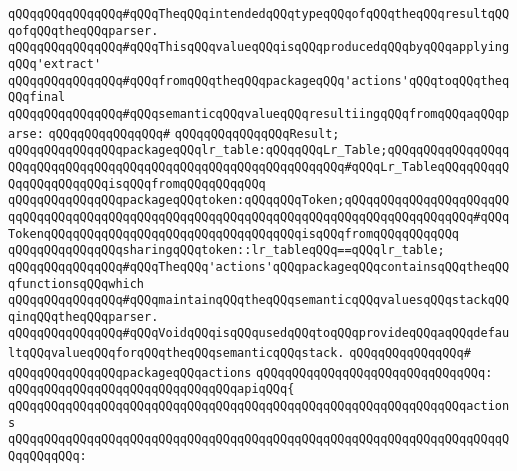 \newline
\verb|qQQqqQQqqQQqqQQq#qQQqTheqQQqintendedqQQqtypeqQQqofqQQqtheqQQqresultqQQqofqQQqtheqQQqparser.|\newline
\verb|qQQqqQQqqQQqqQQq#qQQqThisqQQqvalueqQQqisqQQqproducedqQQqbyqQQqapplyingqQQq'extract'|\newline
\verb|qQQqqQQqqQQqqQQq#qQQqfromqQQqtheqQQqpackageqQQq'actions'qQQqtoqQQqtheqQQqfinal|\newline
\verb|qQQqqQQqqQQqqQQq#qQQqsemanticqQQqvalueqQQqresultiingqQQqfromqQQqaqQQqparse:|\newline
\verb|qQQqqQQqqQQqqQQq#|\newline
\verb|qQQqqQQqqQQqqQQqResult;|\newline
\newline
\verb|qQQqqQQqqQQqqQQqpackageqQQqlr_table:qQQqqQQqLr_Table;qQQqqQQqqQQqqQQqqQQqqQQqqQQqqQQqqQQqqQQqqQQqqQQqqQQqqQQqqQQqqQQq#qQQqLr_TableqQQqqQQqqQQqqQQqqQQqqQQqisqQQqfromqQQqqQQqqQQq|\newline
\verb|qQQqqQQqqQQqqQQqpackageqQQqtoken:qQQqqQQqToken;qQQqqQQqqQQqqQQqqQQqqQQqqQQqqQQqqQQqqQQqqQQqqQQqqQQqqQQqqQQqqQQqqQQqqQQqqQQqqQQqqQQqqQQq#qQQqTokenqQQqqQQqqQQqqQQqqQQqqQQqqQQqqQQqqQQqisqQQqfromqQQqqQQqqQQq|\newline
\verb|qQQqqQQqqQQqqQQqsharingqQQqtoken::lr_tableqQQq==qQQqlr_table;|\newline
\newline
\verb|qQQqqQQqqQQqqQQq#qQQqTheqQQq'actions'qQQqpackageqQQqcontainsqQQqtheqQQqfunctionsqQQqwhich|\newline
\verb|qQQqqQQqqQQqqQQq#qQQqmaintainqQQqtheqQQqsemanticqQQqvaluesqQQqstackqQQqinqQQqtheqQQqparser.|\newline
\verb|qQQqqQQqqQQqqQQq#qQQqVoidqQQqisqQQqusedqQQqtoqQQqprovideqQQqaqQQqdefaultqQQqvalueqQQqforqQQqtheqQQqsemanticqQQqstack.|\newline
\verb|qQQqqQQqqQQqqQQq#|\newline
\verb|qQQqqQQqqQQqqQQqpackageqQQqactions|\newline
\verb|qQQqqQQqqQQqqQQqqQQqqQQqqQQqqQQq:|\newline
\verb|qQQqqQQqqQQqqQQqqQQqqQQqqQQqqQQqapiqQQq{|\newline
\verb|qQQqqQQqqQQqqQQqqQQqqQQqqQQqqQQqqQQqqQQqqQQqqQQqqQQqqQQqqQQqqQQqactions|\newline
\verb|qQQqqQQqqQQqqQQqqQQqqQQqqQQqqQQqqQQqqQQqqQQqqQQqqQQqqQQqqQQqqQQqqQQqqQQqqQQqqQQq:|\newline
